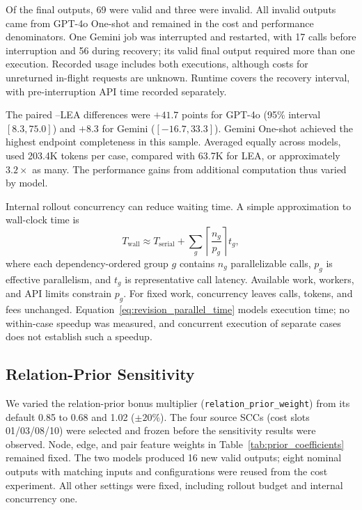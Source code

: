 Of the final outputs, 69 were valid and three were invalid. All invalid outputs came from GPT-4o One-shot and remained in the cost and performance denominators. One Gemini \samcgs{} job was interrupted and restarted, with 17 calls before interruption and 56 during recovery; its valid final output required more than one execution. Recorded usage includes both executions, although costs for unreturned in-flight requests are unknown. Runtime covers the recovery interval, with pre-interruption API time recorded separately.

The paired \samcgs{}--LEA \riskall{} differences were $+41.7$ points for GPT-4o (95\% interval $[8.3,75.0]$) and $+8.3$ for Gemini ($[-16.7,33.3]$). Gemini One-shot achieved the highest endpoint completeness in this sample. Averaged equally across models, \samcgs{} used 203.4K tokens per case, compared with 63.7K for LEA, or approximately $3.2\times$ as many. The performance gains from additional computation thus varied by model.

Internal rollout concurrency can reduce waiting time. A simple approximation to wall-clock time is
\begin{equation}
 T_{\mathrm{wall}}\approx T_{\mathrm{serial}}+
 \sum_g\left\lceil\frac{n_g}{p_g}\right\rceil t_g,
 \label{eq:revision_parallel_time}
\end{equation}
where each dependency-ordered group $g$ contains $n_g$ parallelizable calls, $p_g$ is effective parallelism, and $t_g$ is representative call latency. Available work, workers, and API limits constrain $p_g$. For fixed work, concurrency leaves calls, tokens, and fees unchanged. Equation~\ref{eq:revision_parallel_time} models execution time; no within-case speedup was measured, and concurrent execution of separate cases does not establish such a speedup.

\subsection{Relation-Prior Sensitivity}
\label{app:revision_prior}

We varied the relation-prior bonus multiplier (\texttt{relation\_prior\_weight}) from its default 0.85 to 0.68 and 1.02 ($\pm20\%$). The four source SCCs (cost slots 01/03/08/10) were selected and frozen before the sensitivity results were observed. Node, edge, and pair feature weights in Table~\ref{tab:prior_coefficients} remained fixed. The two models produced 16 new valid outputs; eight nominal outputs with matching inputs and configurations were reused from the cost experiment. All other settings were fixed, including rollout budget and internal concurrency one.

